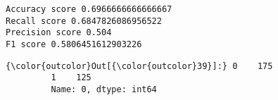 \documentclass[11pt]{article}
\begin{document}
    \begin{Verbatim}[commandchars=\\\{\}]
Accuracy score 0.6966666666666667
Recall score 0.6847826086956522
Precision score 0.504
F1 score 0.5806451612903226

    \end{Verbatim}

\begin{Verbatim}[commandchars=\\\{\}]
{\color{outcolor}Out[{\color{outcolor}39}]:} 0    175
         1    125
         Name: 0, dtype: int64
\end{Verbatim}
            

    
    
    
    
\end{document}
